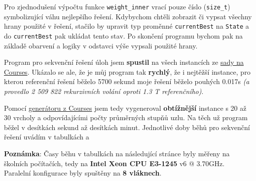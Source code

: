 Pro zjednodušení výpočtu funkce \texttt{weight_inner} vrací pouze číslo (\texttt{size_t}) symbolizující váhu nejlepšího řešení. Kdybychom chtěli zobrazit či vypsat všechny hrany použité v řešení, stačilo by upravit typ proměnné \texttt{currentBest} na \texttt{State} a do \texttt{currentBest} pak ukládat tento stav. Po skončení programu bychom pak na základě obarvení a logiky v odstavci výše vypsali použité hrany.

Program pro sekvenční řešení úloh jsem \textbf{spustil} na všech instancích ze \href{https://courses.fit.cvut.cz/NI-PDP/labs/down/graf_bpo.zip}{sady na Courses}. Ukázalo se ale, že je můj program tak \textbf{rychlý}, že i nejtěžší instance, pro kterou referenční řešení běželo 5700 sekund moje řešení běželo pouhých 0.017s \textit{(a provedlo 2 509 822 rekurzivních volání oproti 1.3 T referenčního)}.

Pomocí \href{https://courses.fit.cvut.cz/NI-PDP/labs/Generator-neorientovanych-grafu.html}{generátoru z Courses} jsem tedy vygeneroval \textbf{obtížnější} instance s 20 až 30 vrcholy a odpovídajícími počty průměrných stupňů uzlu. Na těch už program běžel v desítkách sekund až desítkách minut. Jednotlivé doby běhů pro sekvenční řešení uvádím v tabulkách   a 

\textbf{Poznámka}: Časy běhu v tabulkách na následující stránce byly měřeny na školních počítačích, tedy na \textbf{Intel Xeon CPU E3-1245 }v6 @ 3.70GHz. Paralelní konfigurace byly spuštěny na \textbf{8 vláknech}.

